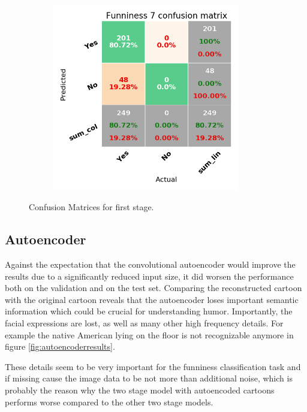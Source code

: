 \documentclass[draft,final,oneside]{vutinfth} %
\begin{document}
\begin{figure}
\begin{subfigure}[b]{0.45\textwidth}
\centering
\includegraphics[width=0.9\textwidth,height=0.3\textheight,keepaspectratio]{graphics/twostageperf/funniness7}
\end{subfigure}


\caption{Confusion Matrices for first stage.}
\label{fig:firststageconf}

\end{figure}


\subsection{Autoencoder}

Against the expectation that the convolutional autoencoder would improve the results due to a significantly reduced input size, it did worsen the performance both on the validation and on the test set. Comparing the reconstructed cartoon with the original cartoon reveals that the autoencoder loses important semantic information which could be crucial for understanding humor. Importantly, the facial expressions are lost, as well as many other high frequency details. For example the native American lying on the floor is not recognizable anymore in figure \ref{fig:autoencoderresults}. 

These details seem to be very important for the funniness classification task and if missing cause the image data to be not more than additional noise, which is probably the reason why the two stage model with autoencoded cartoons performs worse compared to the other two stage models.
\end{document}
